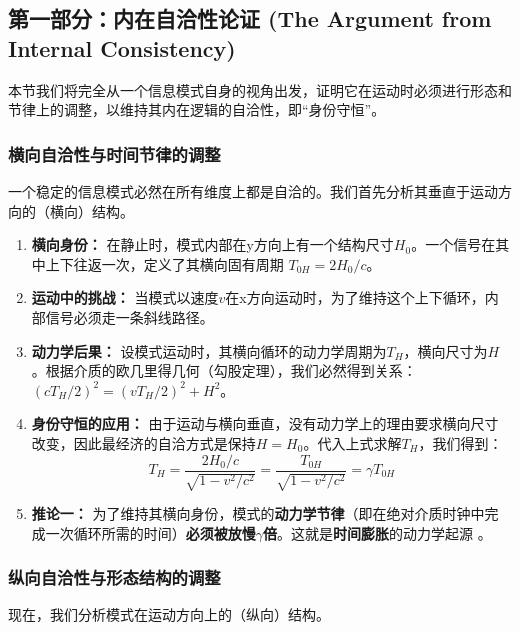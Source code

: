 \documentclass[11pt, a4paper]{article}
\begin{document}
\subsection*{第一部分：内在自洽性论证 (The Argument from Internal Consistency)}

本节我们将完全从一个信息模式自身的视角出发，证明它在运动时必须进行形态和节律上的调整，以维持其内在逻辑的自洽性，即“身份守恒”。

\subsubsection{横向自洽性与时间节律的调整}

一个稳定的信息模式必然在所有维度上都是自洽的。我们首先分析其垂直于运动方向的（横向）结构。

\begin{enumerate}
    \item \textbf{横向身份：} 在静止时，模式内部在y方向上有一个结构尺寸$H_0$。一个信号在其中上下往返一次，定义了其横向固有周期 $T_{0H} = 2H_0 / c$。
    \item \textbf{运动中的挑战：} 当模式以速度$v$在x方向运动时，为了维持这个上下循环，内部信号必须走一条斜线路径。
    \item \textbf{动力学后果：} 设模式运动时，其横向循环的动力学周期为$T_H$，横向尺寸为$H$。根据介质的欧几里得几何（勾股定理），我们必然得到关系：$(c T_H / 2)^2 = (v T_H / 2)^2 + H^2$。
    \item \textbf{身份守恒的应用：} 由于运动与横向垂直，没有动力学上的理由要求横向尺寸改变，因此最经济的自洽方式是保持$H = H_0$。代入上式求解$T_H$，我们得到：
    \[
    T_H = \frac{2H_0/c}{\sqrt{1 - v^2/c^2}} = \frac{T_{0H}}{\sqrt{1 - v^2/c^2}} = \gamma T_{0H}
    \]
    \item \textbf{推论一：} 为了维持其横向身份，模式的\textbf{动力学节律}（即在绝对介质时钟中完成一次循环所需的时间）\textbf{必须被放慢$\gamma$倍}。这就是\textbf{时间膨胀}的动力学起源 \cite{Einstein1905}。
\end{enumerate}

\subsubsection{纵向自洽性与形态结构的调整}

现在，我们分析模式在运动方向上的（纵向）结构。
\end{document}
